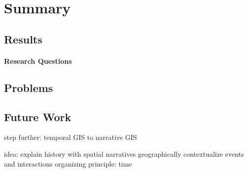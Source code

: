 
\section{Summary} %
\label{sec:summary}


\subsection{Results} %
\label{sub:results}



\paragraph{Research Questions} %
\label{par:result_research_questions}



\subsection{Problems} %
\label{sub:problems}




\subsection{Future Work} %
\label{sub:future_work}

step further: temporal GIS to narrative GIS

idea: explain history with spatial narratives
  geographically contextualize events and interactions
  organizing principle: time




